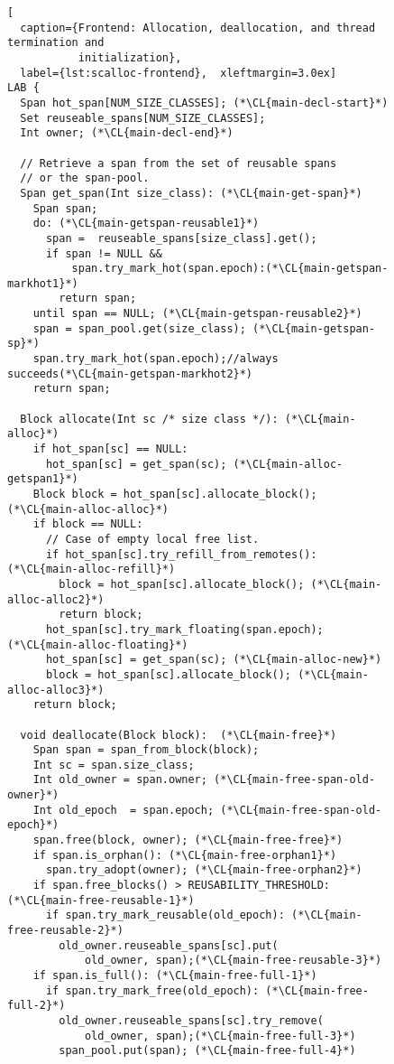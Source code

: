 \documentclass[10pt]{sigplanconf}
\newcommand{\CL}[1]{\label{code:#1}}
\begin{document}
\begin{figure}[ht!]
\begin{lstlisting}[
  caption={Frontend: Allocation, deallocation, and thread termination and
           initialization},
  label={lst:scalloc-frontend},  xleftmargin=3.0ex]
LAB {
  Span hot_span[NUM_SIZE_CLASSES]; (*\CL{main-decl-start}*)
  Set reuseable_spans[NUM_SIZE_CLASSES];
  Int owner; (*\CL{main-decl-end}*)

  // Retrieve a span from the set of reusable spans
  // or the span-pool.
  Span get_span(Int size_class): (*\CL{main-get-span}*)
    Span span; 
    do: (*\CL{main-getspan-reusable1}*)
      span =  reuseable_spans[size_class].get();
      if span != NULL &&
          span.try_mark_hot(span.epoch):(*\CL{main-getspan-markhot1}*)
        return span;
    until span == NULL; (*\CL{main-getspan-reusable2}*)
    span = span_pool.get(size_class); (*\CL{main-getspan-sp}*)
    span.try_mark_hot(span.epoch);//always succeeds(*\CL{main-getspan-markhot2}*)
    return span;

  Block allocate(Int sc /* size class */): (*\CL{main-alloc}*)
    if hot_span[sc] == NULL:
      hot_span[sc] = get_span(sc); (*\CL{main-alloc-getspan1}*)
    Block block = hot_span[sc].allocate_block(); (*\CL{main-alloc-alloc}*)
    if block == NULL:
      // Case of empty local free list.
      if hot_span[sc].try_refill_from_remotes(): (*\CL{main-alloc-refill}*)
        block = hot_span[sc].allocate_block(); (*\CL{main-alloc-alloc2}*)
        return block;
      hot_span[sc].try_mark_floating(span.epoch); (*\CL{main-alloc-floating}*)
      hot_span[sc] = get_span(sc); (*\CL{main-alloc-new}*)
      block = hot_span[sc].allocate_block(); (*\CL{main-alloc-alloc3}*)
    return block;                                       

  void deallocate(Block block):  (*\CL{main-free}*)
    Span span = span_from_block(block);
    Int sc = span.size_class;
    Int old_owner = span.owner; (*\CL{main-free-span-old-owner}*)
    Int old_epoch  = span.epoch; (*\CL{main-free-span-old-epoch}*)
    span.free(block, owner); (*\CL{main-free-free}*)
    if span.is_orphan(): (*\CL{main-free-orphan1}*)
      span.try_adopt(owner); (*\CL{main-free-orphan2}*)
    if span.free_blocks() > REUSABILITY_THRESHOLD: (*\CL{main-free-reusable-1}*)
      if span.try_mark_reusable(old_epoch): (*\CL{main-free-reusable-2}*)
        old_owner.reuseable_spans[sc].put(
            old_owner, span);(*\CL{main-free-reusable-3}*)
    if span.is_full(): (*\CL{main-free-full-1}*)
      if span.try_mark_free(old_epoch): (*\CL{main-free-full-2}*)
        old_owner.reuseable_spans[sc].try_remove(
            old_owner, span);(*\CL{main-free-full-3}*)
        span_pool.put(span); (*\CL{main-free-full-4}*)


\end{lstlisting}
\end{figure}
\end{document}

